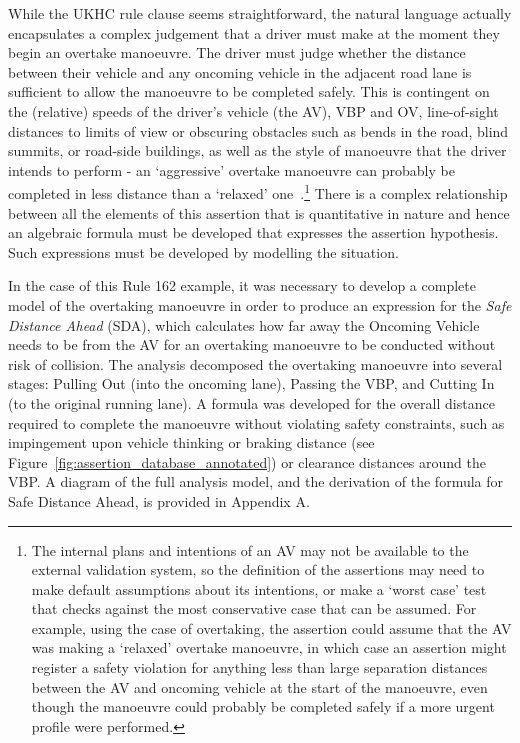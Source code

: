 While the UKHC rule clause seems straightforward, the natural language actually encapsulates a complex judgement that a driver must make at the moment they begin an overtake manoeuvre. The driver must judge whether the distance between their vehicle and any oncoming vehicle in the adjacent road lane is sufficient to allow the manoeuvre to be completed safely. This is contingent on the (relative) speeds of the driver's vehicle (the AV), VBP and OV, line-of-sight distances to limits of view or obscuring obstacles such as bends in the road, blind summits, or road-side buildings, as well as the style of manoeuvre that the driver intends to perform - an `aggressive' overtake manoeuvre can probably be completed in less distance than a `relaxed' one~\cite{decastro2018counterexample, tkachenko2018line}.\footnote{The internal plans and intentions of an AV may not be available to the external validation system, so the definition of the assertions may need to make default assumptions about its intentions, or make a `worst case' test that checks against the most conservative case that can be assumed. For example, using the case of overtaking, the assertion could assume that the AV was making a `relaxed' overtake manoeuvre, in which case an assertion might register a safety violation for anything less than large separation distances between the AV and oncoming vehicle at the start of the manoeuvre, even though the manoeuvre could probably be completed safely if a more urgent profile were performed.} There is a complex relationship between all the elements of this assertion that is quantitative in nature and hence an algebraic formula must be developed that expresses the assertion hypothesis. Such expressions must be developed by modelling the situation.


In the case of this Rule 162 example, it was necessary to develop a complete model of the overtaking manoeuvre in order to produce an expression for the \emph{Safe Distance Ahead} (SDA), which calculates how far away the Oncoming Vehicle needs to be from the AV for an overtaking manoeuvre to be conducted without risk of collision. The analysis decomposed the overtaking manoeuvre into several stages: Pulling Out (into the oncoming lane), Passing the VBP, and Cutting In (to the original running lane). A formula was developed for the overall distance required to complete the manoeuvre without violating safety constraints, such as impingement upon vehicle thinking or braking distance (see Figure~\ref{fig:assertion_database_annotated}) or clearance distances around the VBP. A diagram of the full analysis model, and the derivation of the formula for Safe Distance Ahead, is provided in Appendix A. 

